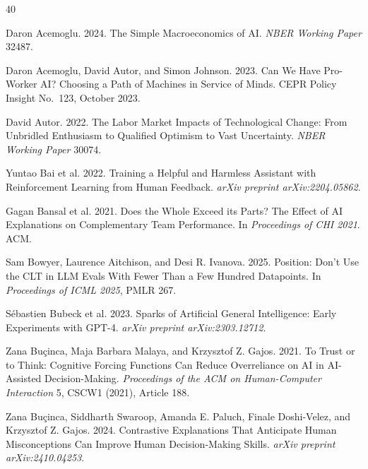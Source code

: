 \documentclass{article}
\begin{document}


\begin{thebibliography}{40}

Daron Acemoglu. 2024.
\newblock The Simple Macroeconomics of AI.
\newblock \textit{NBER Working Paper} 32487.

Daron Acemoglu, David Autor, and Simon Johnson. 2023.
\newblock Can We Have Pro-Worker AI? Choosing a Path of Machines in Service of Minds.
\newblock CEPR Policy Insight No.\ 123, October 2023.

David Autor. 2022.
\newblock The Labor Market Impacts of Technological Change: From Unbridled Enthusiasm to Qualified Optimism to Vast Uncertainty.
\newblock \textit{NBER Working Paper} 30074.

Yuntao Bai et al. 2022.
\newblock Training a Helpful and Harmless Assistant with Reinforcement Learning from Human Feedback.
\newblock \textit{arXiv preprint arXiv:2204.05862}.

Gagan Bansal et al. 2021.
\newblock Does the Whole Exceed its Parts? The Effect of AI Explanations on Complementary Team Performance.
\newblock In \textit{Proceedings of CHI 2021}. ACM.

Sam Bowyer, Laurence Aitchison, and Desi R. Ivanova. 2025.
\newblock Position: Don't Use the CLT in LLM Evals With Fewer Than a Few Hundred Datapoints.
\newblock In \textit{Proceedings of ICML 2025}, PMLR 267.

S\'{e}bastien Bubeck et al. 2023.
\newblock Sparks of Artificial General Intelligence: Early Experiments with GPT-4.
\newblock \textit{arXiv preprint arXiv:2303.12712}.

Zana Bu\c{c}inca, Maja Barbara Malaya, and Krzysztof Z. Gajos. 2021.
\newblock To Trust or to Think: Cognitive Forcing Functions Can Reduce Overreliance on AI in AI-Assisted Decision-Making.
\newblock \textit{Proceedings of the ACM on Human-Computer Interaction} 5, CSCW1 (2021), Article 188.

Zana Bu\c{c}inca, Siddharth Swaroop, Amanda E. Paluch, Finale Doshi-Velez, and Krzysztof Z. Gajos. 2024.
\newblock Contrastive Explanations That Anticipate Human Misconceptions Can Improve Human Decision-Making Skills.
\newblock \textit{arXiv preprint arXiv:2410.04253}.


\end{thebibliography}
\end{document}
